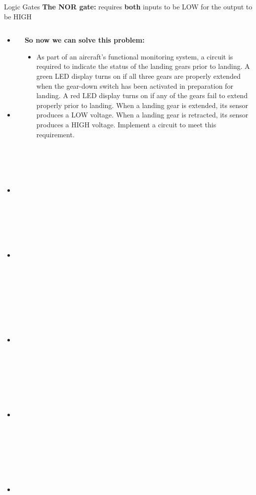 \documentclass{beamer}
\begin{document}
\begin{frame}{Logic Gates}
\textbf{The NOR gate:} requires \textbf{both} inputs to be LOW for the output to be HIGH \\ \vspace{0.5cm}
\begin{columns}[T]
\begin{column}{0.5\textwidth}
\begin{itemize}
\item \alert{NOT, $n=1$, $m=1$}
\item \alert{AND, $n$, $m=1$}
\item \alert{OR, $n$, $m=1$}
\item \alert{NAND, $n$, $m=1$}
\item \alert{NOR, $n=2$, $m=1$}
\item XOR, $n=2$, $m=1$
\item XNOR, $n=2$, $m=1$
\end{itemize}
\end{column}
\begin{column}{0.5\textwidth}
\tiny
\textbf{So now we can solve this problem:}
\begin{itemize}
\item As part of an aircraft's functional monitoring system, a circuit is required to indicate the status of the landing gears prior to landing.  A green LED display turns on if all three gears are properly extended when the gear-down switch has been activated in preparation for landing.  A red LED display turns on if any of the gears fail to extend properly prior to landing.  When a landing gear is extended, its sensor produces a LOW voltage.  When a landing gear is retracted, its sensor produces a HIGH voltage.  Implement a circuit to meet this requirement.
\end{itemize}
\end{column}
\end{columns}
\end{frame}
\end{document}
